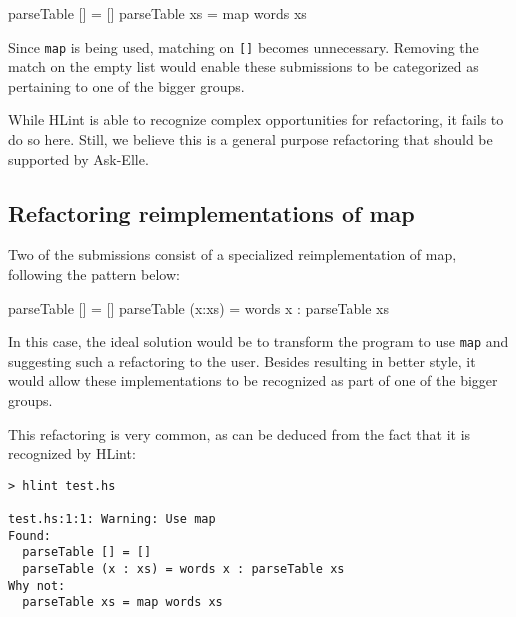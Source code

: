\documentclass[a4paperpaper,]{report}
\newenvironment{Shaded}{}{}
\newcommand{\FunctionTok}[1]{\textcolor[rgb]{0.02,0.16,0.49}{#1}}
\newcommand{\NormalTok}[1]{#1}
\begin{document}
\begin{Shaded}
\begin{Highlighting}[]
\NormalTok{parseTable [] }\FunctionTok{=}\NormalTok{ []}
\NormalTok{parseTable xs }\FunctionTok{=}\NormalTok{ map words xs}
\end{Highlighting}
\end{Shaded}

Since \texttt{map} is being used, matching on \texttt{{[}{]}} becomes
unnecessary. Removing the match on the empty list would enable these
submissions to be categorized as pertaining to one of the bigger groups.

While HLint is able to recognize complex opportunities for refactoring,
it fails to do so here. Still, we believe this is a general purpose
refactoring that should be supported by Ask-Elle.

\hypertarget{refactoring-reimplementations-of-map}{%
\subsection{Refactoring reimplementations of
map}\label{refactoring-reimplementations-of-map}}

Two of the submissions consist of a specialized reimplementation of map,
following the pattern below:

\begin{Shaded}
\begin{Highlighting}[]
\NormalTok{parseTable [] }\FunctionTok{=}\NormalTok{ []}
\NormalTok{parseTable (x}\FunctionTok{:}\NormalTok{xs) }\FunctionTok{=}\NormalTok{ words x }\FunctionTok{:}\NormalTok{ parseTable xs}
\end{Highlighting}
\end{Shaded}

In this case, the ideal solution would be to transform the program to
use \texttt{map} and suggesting such a refactoring to the user. Besides
resulting in better style, it would allow these implementations to be
recognized as part of one of the bigger groups.

This refactoring is very common, as can be deduced from the fact that it
is recognized by HLint:

\begin{verbatim}
> hlint test.hs

test.hs:1:1: Warning: Use map
Found:
  parseTable [] = []
  parseTable (x : xs) = words x : parseTable xs
Why not:
  parseTable xs = map words xs
\end{verbatim}
\end{document}
